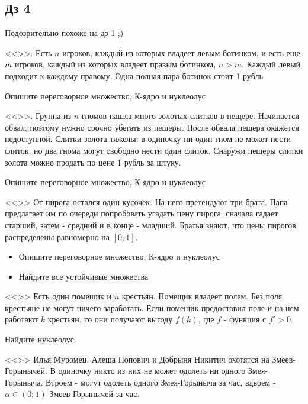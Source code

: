 \subsection{Дз 4}

Подозрительно похоже на дз 1 ;)

\vspace{5pt} <<>>. Есть $n$ игроков, каждый из которых владеет левым ботинком, и есть еще $m$ игроков, каждый из которых владеет правым ботинком, $n>m$. Каждый левый подходит к каждому правому. Одна полная пара ботинок стоит 1 рубль.  

Опишите переговорное множество, К-ядро и нуклеолус

\vspace{5pt} <<>>. Группа из $n$ гномов нашла много золотых слитков в пещере. Начинается обвал, поэтому нужно срочно убегать из пещеры. После обвала пещера окажется недоступной. Слитки золота тяжелы: в одиночку ни один гном не может нести слиток, но два гнома могут свободно нести один слиток. Снаружи пещеры слитки золота можно продать по цене 1 рубль за штуку. 

Опишите переговорное множество, К-ядро и нуклеолус

\vspace{5pt} <<>>
От пирога остался один кусочек. На него претендуют три брата. Папа предлагает им по очереди попробовать угадать цену пирога: сначала гадает старший, затем - средний и в конце - младший. Братья знают, что цены пирогов распределены равномерно на $[0;1]$. 
\begin{itemize}
\item Опишите переговорное множество, К-ядро и нуклеолус
\item Найдите все устойчивые множества
\end{itemize}


\vspace{5pt} <<>>
Есть один помещик и $n$ крестьян. Помещик владеет полем. Без поля крестьяне не могут ничего заработать. Если помещик предоставил поле и на нем работают $k$ крестьян, то они получают выгоду $f(k)$, где $f$ - функция с $f'>0$. 

Найдите нуклеолус


\vspace{5pt} <<>>
Илья Муромец, Алеша Попович и Добрыня Никитич охотятся на Змеев-Горынычей. В одиночку никто из них не может одолеть ни одного Змея-Горыныча. Втроем - могут одолеть одного Змея-Горыныча за час, вдвоем - $\alpha\in (0;1)$ Змеев-Горынычей за час.

